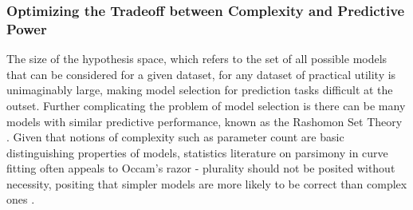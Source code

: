 \documentclass[12pt]{article}  %
\begin{document}
        \subsubsection{Optimizing the Tradeoff between Complexity and Predictive Power}
            \label{sec:decreasing_complexity}
            The size of the hypothesis space, which refers to the set of all possible models that can be considered for a given dataset, for any dataset of practical utility is unimaginably large, making model selection for prediction tasks difficult at the outset. Further complicating the problem of model selection is there can be many models with similar predictive performance, known as the Rashomon Set Theory \citep{semenova22rashomon}. Given that notions of complexity such as parameter count are basic distinguishing properties of models, statistics literature on parsimony in curve fitting often appeals to Occam's razor - plurality should not be posited without necessity,  positing that simpler models are more likely to be correct than complex ones \citep{popper2005logic}.
\end{document}
